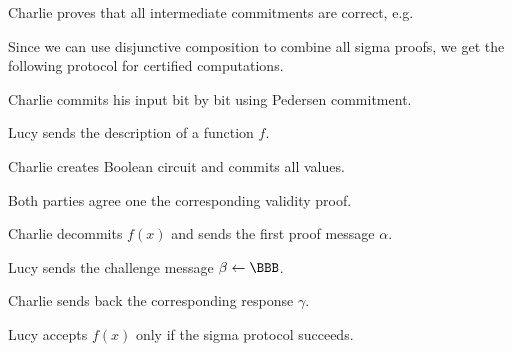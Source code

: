 \documentclass[landscape,footrule]{foils}
\begin{document}

Charlie proves that all intermediate commitments are correct, e.g.
\begin{center}
\end{center}
\bigskip




Since we can use disjunctive composition to combine all sigma proofs,
we get the following protocol for certified computations.
\begin{triangles}
  \item Charlie commits his input bit by bit using Pedersen commitment.
  \item Lucy sends the description of a function $f$.
  \item Charlie creates Boolean circuit and commits all values.
  \item Both parties agree one the corresponding validity  proof.
  \item Charlie decommits $f(x)$ and sends the first proof message $\alpha$.
  \item Lucy sends the challenge message $\beta\gets\BBB$.
  \item Charlie sends back the corresponding response $\gamma$.
  \item Lucy accepts $f(x)$ only if the sigma protocol succeeds.
\end{triangles}
\end{document}
